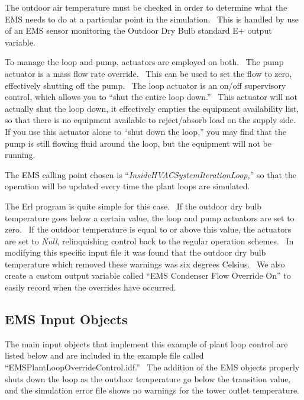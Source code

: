 The outdoor air temperature must be checked in order to determine what the EMS needs to do at a particular point in the simulation.~ This is handled by use of an EMS sensor monitoring the Outdoor Dry Bulb standard E+ output variable.

To manage the loop and pump, actuators are employed on both.~ The pump actuator is a mass flow rate override.~ This can be used to set the flow to zero, effectively shutting off the pump.~ The loop actuator is an on/off supervisory control, which allows you to ``shut the entire loop down.''~ This actuator will not actually shut the loop down, it effectively empties the equipment availability list, so that there is no equipment available to reject/absorb load on the supply side.~ If you use this actuator alone to ``shut down the loop,'' you may find that the pump is still flowing fluid around the loop, but the equipment will not be running.

The EMS calling point chosen is ``\emph{InsideHVACSystemIterationLoop,}'' so that the operation will be updated every time the plant loops are simulated.

The Erl program is quite simple for this case.~ If the outdoor dry bulb temperature goes below a certain value, the loop and pump actuators are set to zero.~ If the outdoor temperature is equal to or above this value, the actuators are set to \emph{Null}, relinquishing control back to the regular operation schemes.~ In modifying this specific input file it was found that the outdoor dry bulb temperature which removed these warnings was six degrees Celsius.~ We also create a custom output variable called ``EMS Condenser Flow Override On'' to easily record when the overrides have occurred.

\subsection{EMS Input Objects}\label{ems-input-objects-000}

The main input objects that implement this example of plant loop control are listed below and are included in the example file called ``EMSPlantLoopOverrideControl.idf.''~ The addition of the EMS objects properly shuts down the loop as the outdoor temperature go below the transition value, and the simulation error file shows no warnings for the tower outlet temperature.

